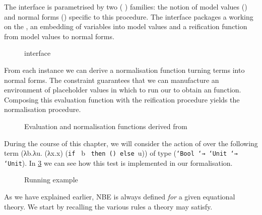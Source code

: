 The  interface is parametrised by two ( )
families: the notion of model values () and normal forms
() specific to this procedure. The interface packages a 
working on the , an embedding of variables into model values
and a reification function from model values to normal forms.

\begin{figure}[h]
\caption{ interface}\label{fig:nbeinterface}
\end{figure}

From each  instance we can derive a normalisation function turning
terms into normal forms. The  constraint guarantees that we can
manufacture an environment of placeholder values in which to run our
 to obtain an  function. Composing this evaluation
function with the reification procedure yields the normalisation procedure.

\begin{figure}[h]
\begin{minipage}[t]{0.55\textwidth}
\end{minipage}\begin{minipage}[t]{0.35\textwidth}
\end{minipage}
\caption{Evaluation and normalisation functions derived from }\label{fig:nbecorrolaries}
\end{figure}

During the course of this chapter, we will consider the action of 
over the following term (λb.λu. (λx.x) (\texttt{if~} b \texttt{~then~()~else~}u))
of type (\texttt{`Bool `→ `Unit `→ `Unit}). In \cref{fig:nbetest} we can see how this
test is implemented in our formalisation.

\begin{figure}[h]
\caption{Running example}\label{fig:nbetest}
\end{figure}

As we have explained earlier, NBE is always defined \emph{for} a given
equational theory. We start by recalling the various rules a theory may
satisfy.

